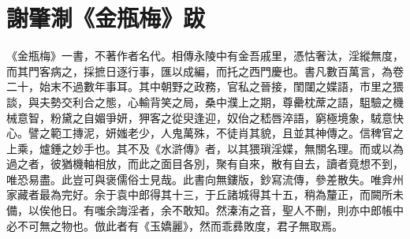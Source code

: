 \chapter*{謝肇淛《金瓶梅》跋}

《金瓶梅》一書，不著作者名代。相傳永陵中有金吾戚里，憑怙奢汰，淫縱無度，而其門客病之，採摭日逐行事，匯以成編，而托之西門慶也。書凡數百萬言，為卷二十，始末不過數年事耳。其中朝野之政務，官私之晉接，閨闥之媟語，市里之猥談，與夫勢交利合之態，心輸背笑之局，桑中濮上之期，尊罍枕蓆之語，駔驗之機械意智，粉黛之自媚爭妍，狎客之從臾逢迎，奴佁之嵇唇淬語，窮極境象，駥意快心。譬之範工摶泥，妍媸老少，人鬼萬殊，不徒肖其貌，且並其神傳之。信稗官之上乘，爐錘之妙手也。其不及《水滸傳》者，以其猥瑣淫媟，無關名理。而或以為過之者，彼猶機軸相放，而此之面目各別，聚有自來，散有自去，讀者竟想不到，唯恐易盡。此豈可與褒儒俗士見哉。此書向無鏤版，鈔寫流傳，參差散失。唯弇州家藏者最為完好。余于袁中郎得其十三，于丘諸城得其十五，稍為釐正，而闕所未備，以俟他日。有嗤余誨淫者，余不敢知。然溱洧之音，聖人不刪，則亦中郎帳中必不可無之物也。倣此者有《玉嬌麗》，然而乖彞敗度，君子無取焉。
  
\begin{quotation}
\end{quotation}

